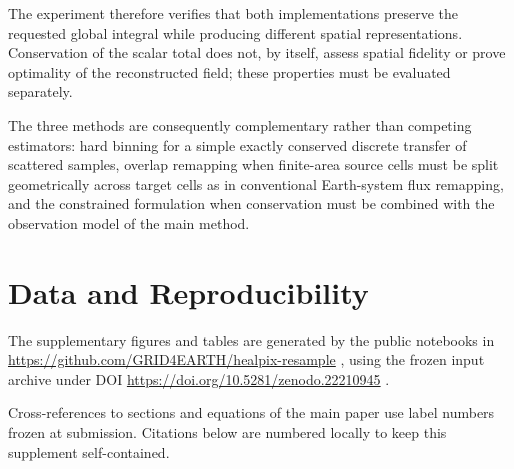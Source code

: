 \documentclass[journal]{IEEEtran}
\begin{document}
The experiment therefore verifies that both implementations
preserve the requested global integral while producing different
spatial representations. Conservation of the scalar total does
not, by itself, assess spatial fidelity or prove optimality of the
reconstructed field; these properties must be evaluated
separately.

The three methods are consequently complementary rather than
competing estimators: hard binning for a simple exactly conserved
discrete transfer of scattered samples, overlap remapping when
finite-area source cells must be split geometrically across target
cells as in conventional Earth-system flux remapping, and the
constrained formulation when conservation must be combined with
the observation model of the main method.



\balance
\section*{Data and Reproducibility}
The supplementary figures and tables are generated by the public notebooks in
\url{https://github.com/GRID4EARTH/healpix-resample}
\cite{healpix_resample_repo}, using the frozen input archive under DOI
\url{https://doi.org/10.5281/zenodo.22210945}
\cite{healpix_resample_paper_data}.

Cross-references to sections and equations of the main paper use label
numbers frozen at submission. Citations below are
numbered locally to keep this supplement self-contained.



\end{document}
